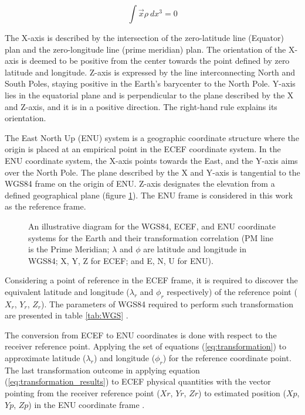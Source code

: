 \begin{equation}
    \int \overrightarrow{x}\rho~dx^3 = 0
    \label{eq:ecef}
\end{equation}

The X-axis is described by the intersection of the zero-latitude line (Equator) plan and the zero-longitude line (prime meridian) plan. The orientation of the X-axis is deemed to be positive from the center towards the point defined by zero latitude and longitude. Z-axis is expressed by the line interconnecting North and South Poles, staying positive in the Earth's barycenter to the North Pole. Y-axis lies in the equatorial plane and is perpendicular to the plane described by the X and Z-axis, and it is in a positive direction. The right-hand rule explains its orientation.

The East North Up (ENU) system is a geographic coordinate structure where the origin is placed at an empirical point in the ECEF coordinate system. In the ENU coordinate system, the X-axis points towards the East, and the Y-axis aims over the North Pole. The plane described by the X and Y-axis is tangential to the WGS84 frame on the origin of ENU. Z-axis designates the elevation from a defined geographical plane (figure \ref{fig:ECEF}). The ENU frame is considered in this work as the reference frame.

\begin{figure}[!h]
    \centering
    \resizebox{0.70\linewidth}{!}{}
    \caption{An illustrative diagram for the WGS84, ECEF, and ENU coordinate systems for the Earth and their transformation correlation (PM line is the Prime Meridian; $\lambda$ and $\phi$ are latitude and longitude in WGS84; X, Y, Z for ECEF; and E, N, U for ENU).  }
    \label{fig:ECEF}
\end{figure}

Considering a point of reference in the ECEF frame, it is required to discover the equivalent latitude and longitude ($\lambda_r$ and $\phi_r$ respectively) of the reference point ($X_r$, $Y_r$, $Z_r$). The parameters of WGS84 required to perform such transformation are presented in table \ref{tab:WGS} \cite{soler1988coordinate}.



The conversion from ECEF to ENU coordinates is done with respect to the receiver reference point. Applying the set of equations (\ref{eq:transformation}) to approximate latitude ($\lambda_r$) and longitude ($\phi_r$) for the reference coordinate point. The last transformation outcome in applying equation (\ref{eq:transformation_results}) to ECEF physical quantities with the vector pointing from the receiver reference point ($Xr$, $Yr$, $Zr$) to estimated position ($Xp$, $Yp$, $Zp$) in the ENU coordinate frame \cite{boucher2001itrs}.

